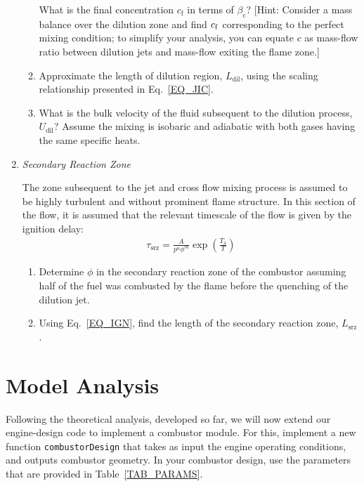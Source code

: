 \documentclass[11pt]{article}
\begin{document}
\begin{enumerate}[label=(\alph*)]
\begin{enumerate}[label=(\roman*)]
           What is the final concentration $c_\mathrm{f}$ in terms of $\beta_\mathrm{c}$? [Hint: Consider a mass balance over the dilution zone and find $c_{\rm{f}}$ corresponding to the perfect mixing condition; to simplify your analysis, you can equate $c$ as mass-flow ratio between dilution jets and mass-flow exiting the flame zone.]
           \item
              Approximate the length of dilution region, $L_\mathrm{dil}$, using the scaling relationship presented in Eq.~\ref{EQ_JIC}.
           \item
           		What is the bulk velocity of the fluid subsequent to the dilution process, $U_\mathrm{dil}$? Assume the mixing is isobaric and adiabatic with both gases having the same specific heats. 
         \end{enumerate}
    \item \textit{Secondary Reaction Zone}
    
    	The zone subsequent to the jet and cross flow mixing process is assumed to be highly turbulent and without prominent flame structure. In this section of the flow, it is assumed that the relevant timescale of the flow is given by the ignition delay:
        \begin{equation}
          \label{EQ_IGN}
          \begin{aligned}
            \tau_\mathrm{srz}=\frac{A}{p^n\phi^m}\exp\left(\frac{T_\mathrm{a}}{T}\right)
          \end{aligned}
        \end{equation}
        \begin{enumerate}[label=(\roman*)]
        \item
        	Determine $\phi$ in the secondary reaction zone of the combustor assuming half of the fuel was combusted by the flame before the quenching of the dilution jet.
        \item
        	Using Eq.~\ref{EQ_IGN}, find the length of the secondary reaction zone, $L_\mathrm{srz}$. 
        \end{enumerate}
\end{enumerate}
\section{Model Analysis}
Following the theoretical analysis, developed so far, we will now extend our engine-design code to implement a combustor module. For this, implement a new function {\tt combustorDesign} that takes as input the engine operating conditions, and outputs combustor geometry. In your combustor design, use the parameters that are provided in Table~\ref{TAB_PARAMS}.
\end{document}
